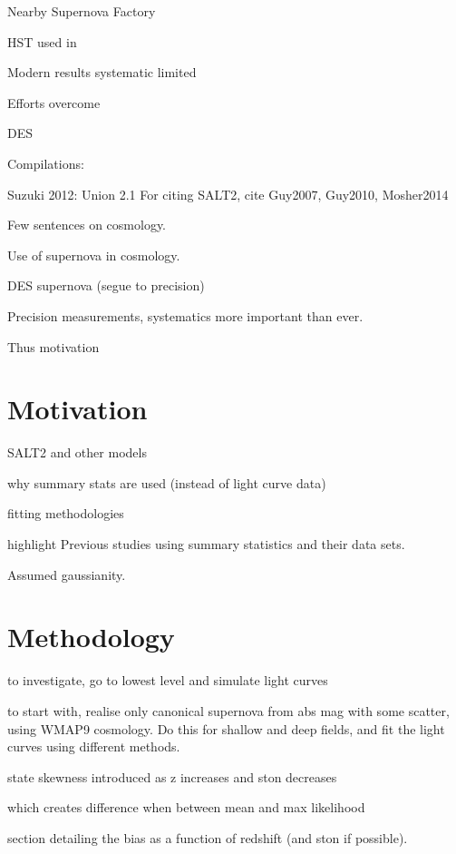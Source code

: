 \documentclass[a4paper,fleqn,usenatbib]{mnras}
\newcommand{\blue}{\color{blue}}
\begin{document}
Nearby Supernova Factory \cite[SNF,][]{AlderingAdam2002}

HST used in \citep{RiessStrolger2007, SuzukiRubin2012}

Modern results systematic limited \citep{ConleyGuy2011, SuzukiRubin2012, ScolnicRest2014}

Efforts overcome \citep{IvezicSmith2007, RegnaultConley2009, TonryStubbs2012}


DES

Compilations:

Suzuki 2012: Union 2.1
For citing SALT2, cite Guy2007, Guy2010, Mosher2014





{\blue
Few sentences on cosmology.



Use of supernova in cosmology.


DES supernova (segue to precision)

Precision measurements, systematics more important than ever.

Thus motivation}

\section{Motivation}


SALT2 and other models

why summary stats are used (instead of light curve data)

fitting methodologies

highlight Previous studies using summary statistics and their data sets.

Assumed gaussianity.



\section{Methodology}

to investigate, go to lowest level and simulate light curves

to start with, realise only canonical supernova from abs mag with some scatter, using WMAP9 cosmology. Do this for shallow and deep fields, and fit the light curves using different methods.

state skewness introduced as z increases and ston decreases

which creates difference when between mean and max likelihood

section detailing the bias as a function of redshift (and ston if possible). 
\end{document}
